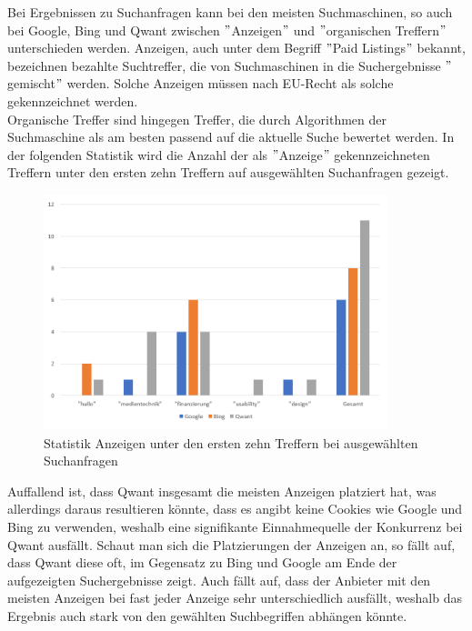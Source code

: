 Bei Ergebnissen zu Suchanfragen kann bei den meisten Suchmaschinen, so auch bei Google,
Bing und Qwant zwischen \("\)Anzeigen\("\) und \("\)organischen Treffern\("\) unterschieden werden.
Anzeigen, auch unter dem Begriff \("\)Paid Listings\("\) bekannt, bezeichnen bezahlte Suchtreffer,
die von Suchmaschinen in die Suchergebnisse \("\)gemischt\("\) werden.
Solche Anzeigen müssen nach EU-Recht als solche gekennzeichnet werden.\\
Organische Treffer sind hingegen Treffer, die durch Algorithmen der Suchmaschine als am besten passend auf die aktuelle Suche bewertet werden.
In der folgenden Statistik wird die Anzahl der als \("\)Anzeige\("\) gekennzeichneten Treffern unter den ersten zehn Treffern auf ausgewählten Suchanfragen gezeigt.\autocite{LEW18}\\
\begin{figure}[ht]
    \centering
    \includegraphics[width=100mm]{images/statistic_adverts}
    \caption{Statistik Anzeigen unter den ersten zehn Treffern bei ausgewählten Suchanfragen}
    \label{fig:statisticAdverts}
\end{figure}
Auffallend ist, dass Qwant insgesamt die meisten Anzeigen platziert hat, was allerdings daraus resultieren könnte,
dass es angibt keine Cookies wie Google und Bing zu verwenden, weshalb eine signifikante Einnahmequelle der Konkurrenz bei Qwant ausfällt.
Schaut man sich die Platzierungen der Anzeigen an, so fällt auf, dass Qwant diese oft,
im Gegensatz zu Bing und Google am Ende der aufgezeigten Suchergebnisse zeigt.
Auch fällt auf, dass der Anbieter mit den meisten Anzeigen bei fast jeder Anzeige sehr unterschiedlich ausfällt,
weshalb das Ergebnis auch stark von den gewählten Suchbegriffen abhängen könnte.\\